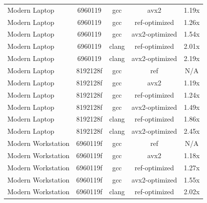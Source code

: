 \begin{table}[H]
\begin{tabularx}{\linewidth}{X c c c c}
               Modern Laptop &              6960119 &                  gcc &                 avx2 &                1.19x\\
               Modern Laptop &              6960119 &                  gcc &        ref-optimized &                1.26x\\
               Modern Laptop &              6960119 &                  gcc &       avx2-optimized &                1.54x\\
               Modern Laptop &              6960119 &                clang &        ref-optimized &                2.01x\\
               Modern Laptop &              6960119 &                clang &       avx2-optimized &                2.19x\\
               Modern Laptop &             8192128f &                  gcc &                  ref &                  N/A\\
               Modern Laptop &             8192128f &                  gcc &                 avx2 &                1.19x\\
               Modern Laptop &             8192128f &                  gcc &        ref-optimized &                1.24x\\
               Modern Laptop &             8192128f &                  gcc &       avx2-optimized &                1.49x\\
               Modern Laptop &             8192128f &                clang &        ref-optimized &                1.86x\\
               Modern Laptop &             8192128f &                clang &       avx2-optimized &                2.45x\\
          Modern Workstation &             6960119f &                  gcc &                  ref &                  N/A\\
          Modern Workstation &             6960119f &                  gcc &                 avx2 &                1.18x\\
          Modern Workstation &             6960119f &                  gcc &        ref-optimized &                1.27x\\
          Modern Workstation &             6960119f &                  gcc &       avx2-optimized &                1.55x\\
          Modern Workstation &             6960119f &                clang &        ref-optimized &                2.02x\\

\end{tabularx}
\end{table}
